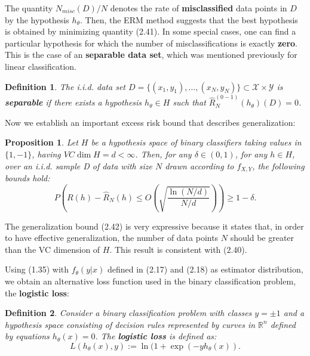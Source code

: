 \documentclass{report}
\newtheorem{definition}{Definition}[chapter]
\newtheorem{proposition}{Proposition}[chapter]
\begin{document}
The quantity $N_{misc}(D)/N$ denotes the rate of \textbf{misclassified} data points in $D$ by the hypothesis $h_\theta$. Then, the ERM method suggests that the best hypothesis is obtained by minimizing quantity (2.41). In some special cases, one can find a particular hypothesis for which the number of misclassifications is exactly \textbf{zero}. This is the case of an \textbf{separable data set}, which was mentioned previously for linear classification.

\begin{definition}
The i.i.d. data set $D = \{(x_1,y_1), \dots, (x_N,y_N)\} \subset \mathcal{X} \times \mathcal{Y}$ is \textbf{separable} if there exists a hypothesis $h_\theta \in H$ such that $\hat{R}^{(0-1)}_N(h_\theta)(D) = 0$.
\end{definition}

Now we establish an important excess risk bound that describes generalization:

\begin{proposition}
Let $H$ be a hypothesis space of binary classifiers taking values in $\{1, -1\}$, having $VC\dim H = d < \infty$. Then, for any $\delta \in (0,1)$, for any $h \in H$, over an i.i.d. sample D of data with size $N$ drawn according to $f_{X,Y}$, the following bounds hold:
\begin{equation}
P\left(R(h) - \hat{R}_N(h) \leq O\left(\sqrt{\frac{\ln(N/d)}{N/d}}\right)\right) \geq 1-\delta.
\end{equation}
\end{proposition}

The generalization bound (2.42) is very expressive because it states that, in order to have effective generalization, the number of data points $N$ should be greater than the VC dimension of $H$. This result is consistent with (2.40).

Using (1.35) with $f_\theta(y|x)$ defined in (2.17) and (2.18) as estimator distribution, we obtain an alternative loss function used in the binary classification problem, the \textbf{logistic loss}:

\begin{definition}
Consider a binary classification problem with classes $y=\pm 1$ and a hypothesis space consisting of decision rules represented by curves in $\mathbb{R}^n$ defined by equations $h_\theta(x) = 0$. The \textbf{logistic loss} is defined as:
\begin{equation}
L(h_\theta(x), y) := \ln(1+\exp(-yh_\theta(x)).
\end{equation}
\end{definition}
\end{document}
